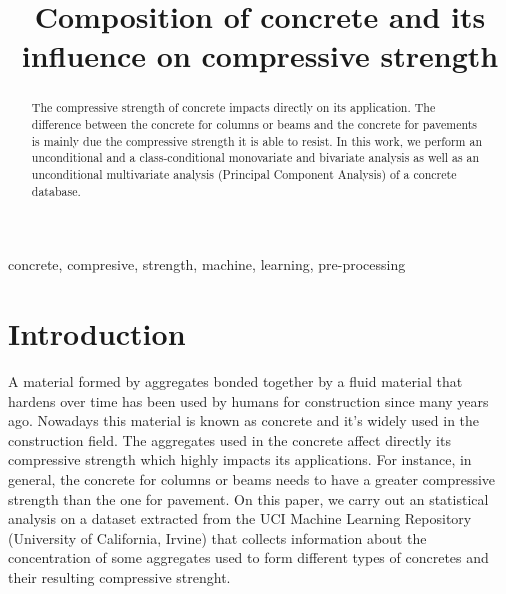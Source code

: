 \documentclass[conference]{IEEEtran}
\begin{document}
\title{Composition of concrete and its influence on compressive strength\\
}

\author{
\and
{}
}

\maketitle

\begin{abstract}
The compressive strength of concrete impacts directly on its application. The difference between the concrete for columns or beams and the concrete for pavements is mainly due the compressive strength it is able to resist. In this work, we perform an unconditional and a class-conditional monovariate and bivariate analysis as well as an unconditional multivariate analysis (Principal Component Analysis) of a concrete database.
\end{abstract}

\begin{IEEEkeywords}
concrete, compresive, strength, machine, learning, pre-processing
\end{IEEEkeywords}

\section{Introduction}
A material formed by aggregates bonded together by a fluid material that hardens over time has been used by humans for construction since many years ago\cite{Mindess}. Nowadays this material is known as concrete and it's widely used in the construction field. The aggregates used in the concrete affect directly its compressive strength which highly impacts its applications. For instance, in general, the concrete for columns or beams needs to have a greater compressive strength than the one for pavement. On this paper, we carry out an statistical analysis on a dataset extracted from the UCI Machine Learning Repository (University of California, Irvine) that collects information about the concentration of some aggregates used to form different types of concretes and their resulting compressive strenght. 
\end{document}
